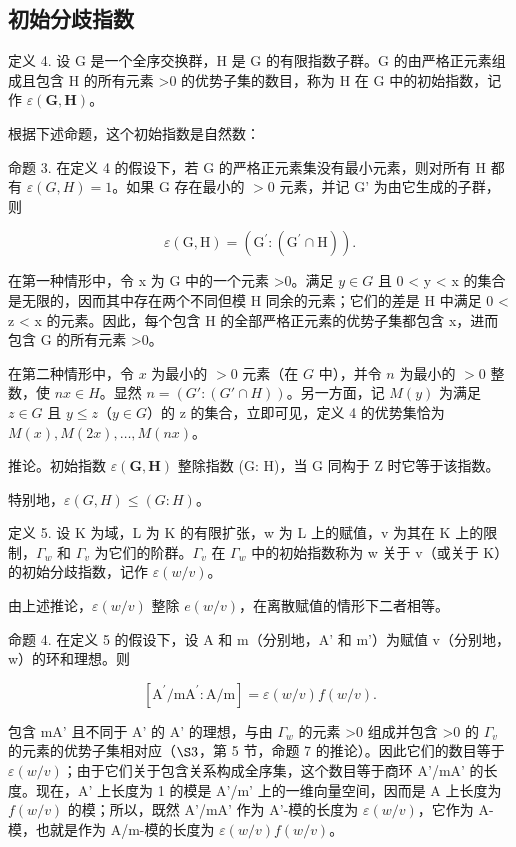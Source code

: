 \subsection{初始分歧指数}

定义 4. 设 G 是一个全序交换群，H 是 G 的有限指数子群。G 的由严格正元素组成且包含 H 的所有元素 \textgreater0 的优势子集的数目，称为 H 在 G 中的初始指数，记作 \(\varepsilon(\mathbf{G}, \mathbf{H})\)。

根据下述命题，这个初始指数是自然数：

命题 3. 在定义 4 的假设下，若 G 的严格正元素集没有最小元素，则对所有 H 都有 \(\varepsilon(G, H) = 1\)。如果 G 存在最小的 \(>0\) 元素，并记 G' 为由它生成的子群，则

\[
\varepsilon (\mathrm{G}, \mathrm{H}) = (\mathrm{G} ^ {\prime}: (\mathrm{G} ^ {\prime} \cap \mathrm{H})).
\]

在第一种情形中，令 x 为 G 中的一个元素 \textgreater0。满足 \(y \in G\) 且 0 \textless{} y \textless{} x 的集合是无限的，因而其中存在两个不同但模 H 同余的元素；它们的差是 H 中满足 0 \textless{} z \textless{} x 的元素。因此，每个包含 H 的全部严格正元素的优势子集都包含 x，进而包含 G 的所有元素 \textgreater0。

在第二种情形中，令 \(x\) 为最小的 \(>0\) 元素（在 \(G\) 中），并令 \(n\) 为最小的 \(>0\) 整数，使 \(nx \in H\)。显然 \(n = (G': (G' \cap H))\)。另一方面，记 \(M(y)\) 为满足 \(z \in G\) 且 \(y \leqslant z\)（\(y \in G\)）的 z 的集合，立即可见，定义 4 的优势集恰为 \(M(x), M(2x), \ldots, M(nx)\)。

推论。初始指数 \(\varepsilon(\mathbf{G},\mathbf{H})\) 整除指数 (G: H)，当 G 同构于 Z 时它等于该指数。

特别地，\(\varepsilon(G, H) \leqslant (G: H)\)。

定义 5. 设 K 为域，L 为 K 的有限扩张，w 为 L 上的赋值，v 为其在 K 上的限制，\(\Gamma_{w}\) 和 \(\Gamma_{v}\) 为它们的阶群。\(\Gamma_{v}\) 在 \(\Gamma_{w}\) 中的初始指数称为 w 关于 v（或关于 K）的初始分歧指数，记作 \(\varepsilon(w/v)\)。

由上述推论，\(\varepsilon(w/v)\) 整除 \(e(w/v)\)，在离散赋值的情形下二者相等。

命题 4. 在定义 5 的假设下，设 A 和 m（分别地，A' 和 m'）为赋值 v（分别地，w）的环和理想。则

\[
[ \mathrm{A} ^ {\prime} / \mathrm{mA} ^ {\prime}: \mathrm{A} / \mathrm{m} ] = \varepsilon (w / v) f (w / v).
\]

包含 mA' 且不同于 A' 的 A' 的理想，与由 \(\Gamma_{w}\) 的元素 \textgreater0 组成并包含 \textgreater0 的 \(\Gamma_{v}\) 的元素的优势子集相对应（\(\S3\)，第 5 节，命题 7 的推论）。因此它们的数目等于 \(\varepsilon(w/v)\)；由于它们关于包含关系构成全序集，这个数目等于商环 A'/mA' 的长度。现在，A' 上长度为 1 的模是 A'/m' 上的一维向量空间，因而是 A 上长度为 \(f(w/v)\) 的模；所以，既然 A'/mA' 作为 A'-模的长度为 \(\varepsilon(w/v)\)，它作为 A-模，也就是作为 A/m-模的长度为 \(\varepsilon(w/v)f(w/v)\)。

